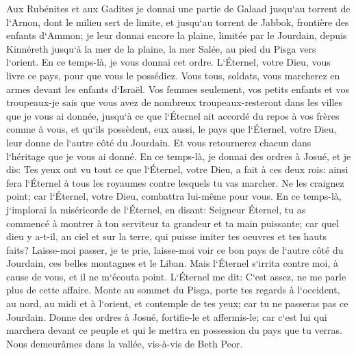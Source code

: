\verse Aux Rubénites et aux Gadites je donnai une partie de Galaad jusqu`au torrent de l`Arnon, dont le milieu sert de limite, et jusqu`au torrent de Jabbok, frontière des enfants d`Ammon; 
\verse je leur donnai encore la plaine, limitée par le Jourdain, depuis Kinnéreth jusqu`à la mer de la plaine, la mer Salée, au pied du Pisga vers l`orient. 
\verse En ce temps-là, je vous donnai cet ordre. L`Éternel, votre Dieu, vous livre ce pays, pour que vous le possédiez. Vous tous, soldats, vous marcherez en armes devant les enfants d`Israël. 
\verse Vos femmes seulement, vos petits enfants et vos troupeaux-je sais que vous avez de nombreux troupeaux-resteront dans les villes que je vous ai donnée, 
\verse jusqu`à ce que l`Éternel ait accordé du repos à vos frères comme à vous, et qu`ils possèdent, eux aussi, le pays que l`Éternel, votre Dieu, leur donne de l`autre côté du Jourdain. Et vous retournerez chacun dans l`héritage que je vous ai donné. 
\verse En ce temps-là, je donnai des ordres à Josué, et je dis: Tes yeux ont vu tout ce que l`Éternel, votre Dieu, a fait à ces deux rois: ainsi fera l`Éternel à tous les royaumes contre lesquels tu vas marcher. 
\verse Ne les craignez point; car l`Éternel, votre Dieu, combattra lui-même pour vous. 
\verse En ce temps-là, j`implorai la miséricorde de l`Éternel, en disant: 
\verse Seigneur Éternel, tu as commencé à montrer à ton serviteur ta grandeur et ta main puissante; car quel dieu y a-t-il, au ciel et sur la terre, qui puisse imiter tes oeuvres et tes hauts faits? 
\verse Laisse-moi passer, je te prie, laisse-moi voir ce bon pays de l`autre côté du Jourdain, ces belles montagnes et le Liban. 
\verse Mais l`Éternel s`irrita contre moi, à cause de vous, et il ne m`écouta point. L`Éternel me dit: C`est assez, ne me parle plus de cette affaire. 
\verse Monte au sommet du Pisga, porte tes regards à l`occident, au nord, au midi et à l`orient, et contemple de tes yeux; car tu ne passeras pas ce Jourdain. 
\verse Donne des ordres à Josué, fortifie-le et affermis-le; car c`est lui qui marchera devant ce peuple et qui le mettra en possession du pays que tu verras. 
\verse Nous demeurâmes dans la vallée, vis-à-vis de Beth Peor. 

\chapter{}

